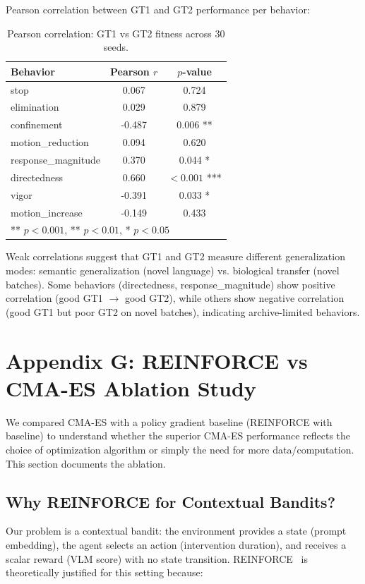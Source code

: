 \documentclass{article}
\begin{document}
Pearson correlation between GT1 and GT2 performance per behavior:

\begin{table}[h]
\centering
\caption{Pearson correlation: GT1 vs GT2 fitness across 30 seeds.}
\begin{tabular}{lcc}
\toprule
Behavior & Pearson $r$ & $p$-value \\
\midrule
stop & 0.067 & 0.724 \\
elimination & 0.029 & 0.879 \\
confinement & -0.487 & 0.006 ** \\
motion\_reduction & 0.094 & 0.620 \\
response\_magnitude & 0.370 & 0.044 * \\
directedness & 0.660 & $<0.001$ *** \\
vigor & -0.391 & 0.033 * \\
motion\_increase & -0.149 & 0.433 \\
\bottomrule
\multicolumn{3}{l}{\small *** $p < 0.001$, ** $p < 0.01$, * $p < 0.05$}
\end{tabular}
\end{table}

Weak correlations suggest that GT1 and GT2 measure different generalization modes: semantic generalization (novel language) vs. biological transfer (novel batches). Some behaviors (directedness, response\_magnitude) show positive correlation (good GT1 $\to$ good GT2), while others show negative correlation (good GT1 but poor GT2 on novel batches), indicating archive-limited behaviors.

\section*{Appendix G: REINFORCE vs CMA-ES Ablation Study}
\label{app:reinforce_ablation}

We compared CMA-ES with a policy gradient baseline (REINFORCE with baseline) to understand whether the superior CMA-ES performance reflects the choice of optimization algorithm or simply the need for more data/computation. This section documents the ablation.

\subsection{Why REINFORCE for Contextual Bandits?}

Our problem is a contextual bandit: the environment provides a state (prompt embedding), the agent selects an action (intervention duration), and receives a scalar reward (VLM score) with no state transition. REINFORCE~\cite{williams1992simple} is theoretically justified for this setting because:
\end{document}
